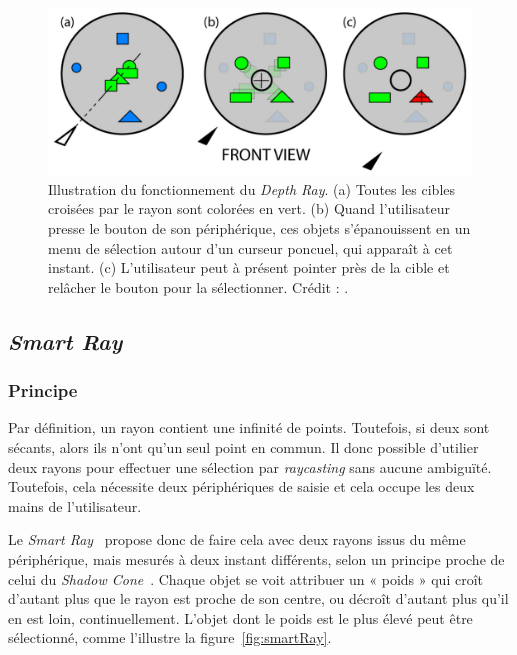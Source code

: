 	\begin{figure}[H]
		\centering
		\includegraphics[width=\textwidth]{figures/ch2/flowerRay}
		\caption[Principe du \emph{Flower Ray}]{Illustration du fonctionnement du \emph{Depth Ray}. (a) Toutes les cibles croisées par le rayon sont colorées en vert. (b) Quand l'utilisateur presse le bouton de son périphérique, ces objets s'épanouissent en un menu de sélection autour d'un curseur poncuel, qui apparaît à cet instant. (c) L'utilisateur peut à présent pointer près de la cible et relâcher le bouton pour la sélectionner. Crédit : \cite{grossman2006design}.}
		\label{fig:flowerRay}
	\end{figure}
	
	\subsection{\emph{Smart Ray}}
	\subsubsection{Principe}
	Par définition, un rayon contient une infinité de points. Toutefois, si deux sont sécants, alors ils n'ont qu'un seul point en commun. Il donc possible d'utilier deux rayons pour effectuer une sélection par \emph{raycasting} sans aucune ambiguïté. Toutefois, cela nécessite deux périphériques de saisie et cela occupe les deux mains de l'utilisateur.
	
	Le \emph{Smart Ray}~\cite{grossman2006design} propose donc de faire cela avec deux rayons issus du même périphérique, mais mesurés à deux instant différents, selon un principe proche de celui du \emph{Shadow Cone}~\cite{steed20043d}. Chaque objet se voit attribuer un « poids » qui croît d'autant plus que le rayon est proche de son centre, ou décroît d'autant plus qu'il en est loin, continuellement. L'objet dont le poids est le plus élevé peut être sélectionné, comme l'illustre la figure~\ref{fig:smartRay}.
	

